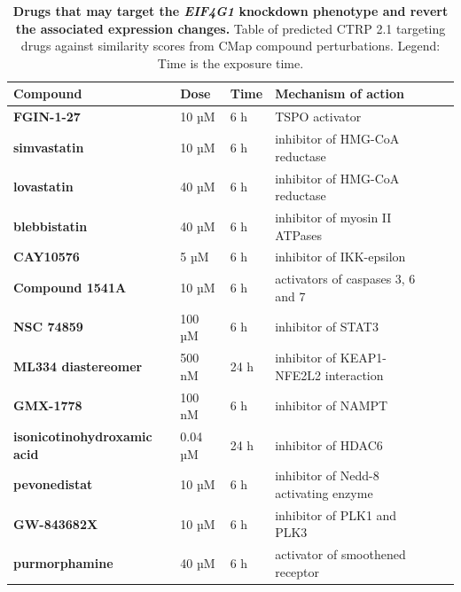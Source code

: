 \begin{table}[!b]
\centering
\footnotesize
\caption[Table of drugs that may target the \emph{EIF4G1} knockdown phenotype]{\textbf{Drugs that may target the \emph{EIF4G1} knockdown phenotype and revert the associated expression changes.} Table of predicted CTRP 2.1 targeting drugs against similarity scores from CMap compound perturbations. Legend: Time is the exposure time.}
\label{tab:ctrap-target-revert-table}

\begin{tabular}{llllll}
\toprule
\textbf{Compound}                       & \textbf{Dose} & \textbf{Time} & \textbf{Mechanism of action} \\
\midrule
\textbf{FGIN-1-27}                  & 10 µM                & 6 h                  & TSPO activator \\
\textbf{simvastatin}                & 10 µM                & 6 h                  & inhibitor of HMG-CoA reductase                                       \\
\textbf{lovastatin}                 & 40 µM                & 6 h                  & inhibitor of HMG-CoA reductase                                       \\
\textbf{blebbistatin}               & 40 µM                & 6 h                  & inhibitor of myosin II ATPases                                       \\
\textbf{CAY10576}                   & 5 µM                 & 6 h                  & inhibitor of IKK-epsilon                                             \\
\textbf{Compound 1541A}             & 10 µM                & 6 h                  & activators of caspases 3, 6 and 7                    \\
\textbf{NSC 74859}                  & 100 µM               & 6 h                  & inhibitor of STAT3                                                   \\
\textbf{ML334 diastereomer}         & 500 nM               & 24 h                 & inhibitor of KEAP1-NFE2L2 interaction                \\
\textbf{GMX-1778}                   & 100 nM               & 6 h                  & inhibitor of NAMPT                  \\
\textbf{isonicotinohydroxamic acid} & 0.04 µM              & 24 h                 & inhibitor of HDAC6                                                   \\
\textbf{pevonedistat}               & 10 µM                & 6 h                  & inhibitor of Nedd-8 activating enzyme                                \\
\textbf{GW-843682X}                 & 10 µM                & 6 h                  & inhibitor of PLK1 and PLK3                                           \\
\textbf{purmorphamine}              & 40 µM                & 6 h                  & activator of smoothened receptor                                    \\
\bottomrule
\end{tabular}
\end{table}

